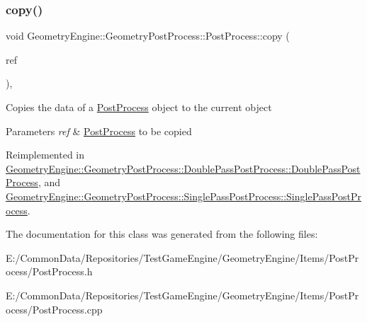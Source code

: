 \subsubsection{\texorpdfstring{copy()}{copy()}}
{\footnotesize\ttfamily void Geometry\+Engine\+::\+Geometry\+Post\+Process\+::\+Post\+Process\+::copy (\begin{DoxyParamCaption}\item[{const \mbox{\hyperlink{class_geometry_engine_1_1_geometry_post_process_1_1_post_process}{Post\+Process}} \&}]{ref }\end{DoxyParamCaption})\hspace{0.3cm}{\ttfamily [protected]}, {\ttfamily [virtual]}}

Copies the data of a \mbox{\hyperlink{class_geometry_engine_1_1_geometry_post_process_1_1_post_process}{Post\+Process}} object to the current object 
\begin{DoxyParams}{Parameters}
{\em ref} & \mbox{\hyperlink{class_geometry_engine_1_1_geometry_post_process_1_1_post_process}{Post\+Process}} to be copied \\
\hline
\end{DoxyParams}


Reimplemented in \mbox{\hyperlink{class_geometry_engine_1_1_geometry_post_process_1_1_double_pass_post_process_1_1_double_pass_post_process_a28b760437951a4676b55efb491358e8f}{Geometry\+Engine\+::\+Geometry\+Post\+Process\+::\+Double\+Pass\+Post\+Process\+::\+Double\+Pass\+Post\+Process}}, and \mbox{\hyperlink{class_geometry_engine_1_1_geometry_post_process_1_1_single_pass_post_process_1_1_single_pass_post_process_ab47b36f68057dcff05402a9e5a630878}{Geometry\+Engine\+::\+Geometry\+Post\+Process\+::\+Single\+Pass\+Post\+Process\+::\+Single\+Pass\+Post\+Process}}.



The documentation for this class was generated from the following files\+:\begin{DoxyCompactItemize}
\item 
E\+:/\+Common\+Data/\+Repositories/\+Test\+Game\+Engine/\+Geometry\+Engine/\+Items/\+Post\+Process/Post\+Process.\+h\item 
E\+:/\+Common\+Data/\+Repositories/\+Test\+Game\+Engine/\+Geometry\+Engine/\+Items/\+Post\+Process/Post\+Process.\+cpp\end{DoxyCompactItemize}
